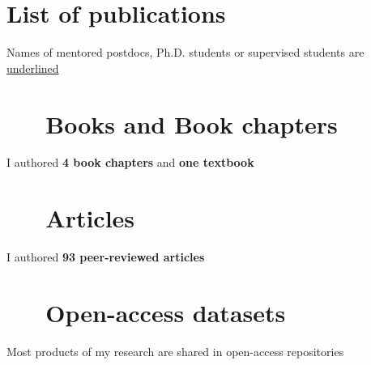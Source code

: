 \documentclass[%
               doublesided,
               paper=a4,
               fontsize=10pt
              ]{my-resume}
\begin{document}
\clearpage

\pagestyle{empty}

\section[\faAreaChart]{List of publications}
Names of mentored postdocs, Ph.D. students or supervised students are \underline{underlined}

\nocite{*}
\section{\faBook \ \ \ Books and Book chapters}
I authored \textbf{4 book chapters} and \textbf{one textbook}
\printbibliography[type=book,heading=none]
\section{\faFileTextO \ \ \  Articles}
I authored \textbf{93 peer-reviewed articles}
\printbibliography[type=article,heading=none]
\section{\faFileTextO \ \ \  Open-access datasets}
Most products of my research are shared in open-access repositories
\printbibliography[type=dataset,heading=none]


\end{document}
